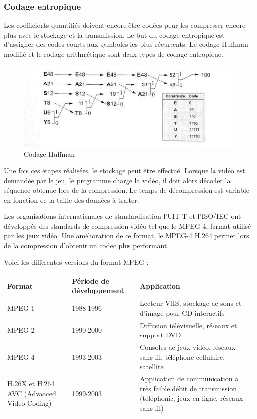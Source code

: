 \documentclass[a4paper, 12pt]{article} %
\begin{document}
\subsubsection{Codage entropique}
Les coefficients quantifiés doivent encore être codées pour les compresser encore plus avec le stockage et la transmission. Le but du codage entropique est d'assigner des codes courts aux symboles les plus récurrents. Le codage Huffman modifié et le codage arithmétique sont deux types de codage entropique.

\begin{figure}[!h]%
\includegraphics[width=\textwidth]{images/codage_huffman.jpg}%
\caption{Codage Huffman}%
\label{}%
\end{figure}

Une fois ces étapes réalisées, le stockage peut être effectué. Lorsque la vidéo est demandée par le jeu, le programme charge la vidéo, il doit alors décoder la séquence obtenue lors de la compression. Le temps de décompression est variable en fonction de la taille des données à traiter. 

Les organisations internationales de standardisation l'UIT-T et l'ISO/IEC ont développés des standards de compression vidéo tel que le MPEG-4, format utilisé par les jeux vidéo. Une amélioration de ce format, le MPEG-4 H.264 permet lors de la compression d'obtenir un codec plus performant.

Voici les différentes versions du format MPEG :

\begin{center}
	\begin{tabular}{|p{}|p{}|p{}|}
		\hline
		Format & Période de développement & Application\\
		\hline
		MPEG-1&1988-1996&Lecteur VHS, stockage de sons et d'image pour CD interactifs\\
		MPEG-2&1990-2000&Diffusion télévisuelle, réseaux et support DVD\\
		MPEG-4&1993-2003&Consoles de jeux vidéo, réseaux sans fil, téléphone cellulaire, satellite\\
		H.26X et H.264 AVC (Advanced Video Coding)&1999-2003&Application de communication à très faible débit de transmission (téléphonie, jeux en ligne, réseaux sans fil)\\
		\hline
	\end{tabular}
\end{center}
\end{document}
